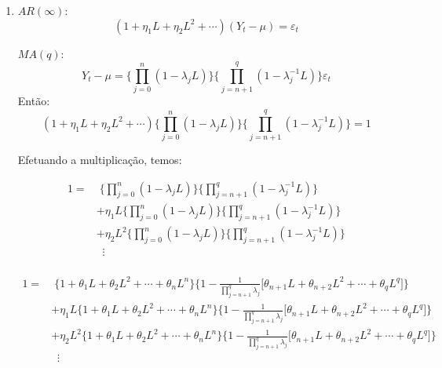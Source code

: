 \begin{enumerate}
	\item %
	
	$AR(\infty)$: $$(1+\eta_1L+\eta_2L^2+\cdots)(Y_t-\mu)=\varepsilon_t$$
	
	$MA(q)$:$$Y_t-\mu=\Bigg\{\prod\limits_{j=0}^n(1-\lambda_jL)\Bigg\}\Bigg\{\prod\limits_{j=n+1}^q(1-\lambda_j^{-1}L)\Bigg\}\varepsilon_t$$		
	Então:
	$$(1+\eta_1L+\eta_2L^2+\cdots)\Bigg\{\prod\limits_{j=0}^n(1-\lambda_jL)\Bigg\}\Bigg\{\prod\limits_{j=n+1}^q(1-\lambda_j^{-1}L)\Bigg\}=1$$
	
	Efetuando a multiplicação, temos:
	
	\begin{align*}
		1=&\; \Bigg\{\prod\limits_{j=0}^n(1-\lambda_jL)\Bigg\}\Bigg\{\prod\limits_{j=n+1}^q(1-\lambda_j^{-1}L)\Bigg\}\\
		&+\eta_1L\Bigg\{\prod\limits_{j=0}^n(1-\lambda_jL)\Bigg\}\Bigg\{\prod\limits_{j=n+1}^q(1-\lambda_j^{-1}L)\Bigg\}\\
		&+\eta_2L^2\Bigg\{\prod\limits_{j=0}^n(1-\lambda_jL)\Bigg\}\Bigg\{\prod\limits_{j=n+1}^q(1-\lambda_j^{-1}L)\Bigg\}\\
		&\;\;\vdots\\
	\end{align*}


\begin{align*}
	1=&\; \Bigg\{1+\theta_1L+\theta_2L^2+\cdots+\theta_nL^n\Bigg\}\Bigg\{1-\frac{1}{\prod\limits_{j=n+1}^q\lambda_j}\bigg[\theta_{n+1}L+\theta_{n+2}L^2+\cdots+\theta_qL^q\bigg]\Bigg\}\\
	&+\eta_1L\Bigg\{1+\theta_1L+\theta_2L^2+\cdots+\theta_nL^n\Bigg\}\Bigg\{1-\frac{1}{\prod\limits_{j=n+1}^q\lambda_j}\bigg[\theta_{n+1}L+\theta_{n+2}L^2+\cdots+\theta_qL^q\bigg]\Bigg\}\\
	&+\eta_2L^2\Bigg\{1+\theta_1L+\theta_2L^2+\cdots+\theta_nL^n\Bigg\}\Bigg\{1-\frac{1}{\prod\limits_{j=n+1}^q\lambda_j}\bigg[\theta_{n+1}L+\theta_{n+2}L^2+\cdots+\theta_qL^q\bigg]\Bigg\}\\
	&\;\;\vdots\\
\end{align*}


\end{enumerate}
